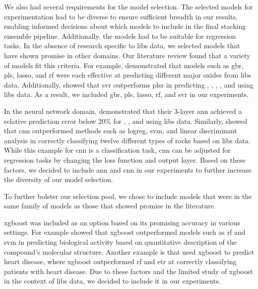 We also had several requirements for the model selection.
The selected models for experimentation had to be diverse to ensure sufficient breadth in our results, enabling informed decisions about which models to include in the final stacking ensemble pipeline.
Additionally, the models had to be suitable for regression tasks. 
In the absence of research specific to \gls{libs} data, we selected models that have shown promise in other domains.
Our literature review found that a variety of models fit this criteria.
For example, \citet{andersonPostlandingMajorElement2022} demonstrated that models such as \gls{gbr}, \gls{pls}, \gls{lasso}, and \gls{rf} were each effective at predicting different major oxides from \gls{libs} data. 
Additionally, \citet{svrforlibs} showed that \gls{svr} outperforms \gls{plsr} in predicting , , , , and  using \gls{libs} data.
As a result, we included \gls{gbr}, \gls{pls}, \gls{lasso}, \gls{rf}, and \gls{svr} in our experiments.

In the neural network domain, \citet{ann_libs_soil_analysis} demonstrated that their 3-layer \gls{ann} achieved a relative prediction error below 20\% for , , and  using \gls{libs} data. 
Similarly, \citet{yangConvolutionalNeuralNetwork2022} showed that \gls{cnn} outperformed methods such as \gls{logreg}, \gls{svm}, and linear discriminant analysis in correctly classifying twelve different types of rocks based on \gls{libs} data.
While this example for \gls{cnn} is a classification task, \gls{cnn} can be adjusted for regression tasks by changing the loss function and output layer.
Based on these factors, we decided to include \gls{ann} and \gls{cnn} in our experiments to further increase the diversity of our model selection.

To further bolster our selection pool, we chose to include models that were in the same family of models as those that showed promise in the literature.

\gls{xgboost} was included as an option based on its promising accuracy in various settings.
For example \citet{xgboost_in_biomedicie} showed that \gls{xgboost} outperformed models such as \gls{rf} and \gls{svm} in predicting biological activity based on quantitative description of the compound's molecular structure. 
Another example is \citet{xgboost_in_heart_disease} that used \gls{xgboost} to predict heart disease, where \gls{xgboost} outperformed \gls{rf} and \gls{etr} at correctly classifying patients with heart disease.
Due to these factors and the limited study of \gls{xgboost} in the context of \gls{libs} data, we decided to include it in our experiments.

